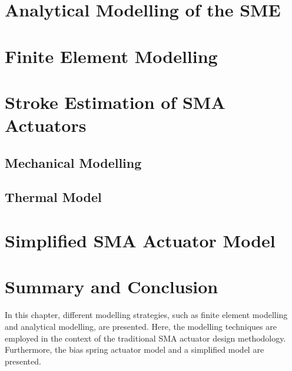 \section{Analytical Modelling of the SME}
\section{Finite Element Modelling}
\section{Stroke Estimation of SMA Actuators}
\subsection{Mechanical Modelling}
\subsection{Thermal Model}
\section{Simplified SMA Actuator Model}\label{sec:simplified-sma-model}
\section{Summary and Conclusion}
In this chapter, different modelling strategies, such as finite element modelling and analytical modelling, are presented. Here, the modelling techniques are employed in the context of the traditional SMA actuator design methodology. Furthermore, the bias spring actuator model and a simplified model are presented.
